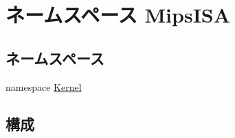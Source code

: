\hypertarget{namespaceMipsISA}{
\section{ネームスペース MipsISA}
\label{namespaceMipsISA}
}
\subsection*{ネームスペース}
\begin{DoxyCompactItemize}
\item 
namespace \hyperlink{namespaceMipsISA_1_1Kernel}{Kernel}
\end{DoxyCompactItemize}
\subsection*{構成}
